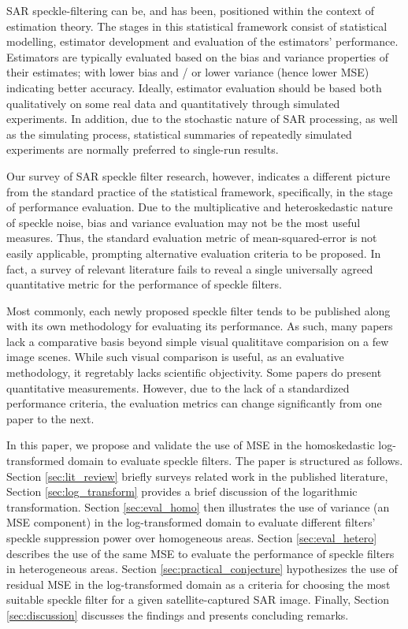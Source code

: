 \documentclass[journal]{IEEEtran}
\begin{document}
SAR speckle-filtering can be, and has been, positioned within the context of estimation theory\cite{Touzi_2002_TGRS}. 
The stages in this statistical framework consist of statistical modelling, estimator development and evaluation of the estimators' performance. 
Estimators are typically evaluated based on the bias and variance properties of their estimates; 
	with lower bias and / or lower variance (hence lower MSE) indicating better accuracy.
Ideally, estimator evaluation should be based both qualitatively on some real data and quantitatively through simulated experiments. 
In addition, due to the stochastic nature of SAR processing, as well as the simulating process, 
	statistical summaries of repeatedly simulated experiments are normally preferred to single-run results.

Our survey of SAR speckle filter research, however, indicates 
	a different picture from the standard practice of the statistical framework, 
	specifically, in the stage of performance evaluation. 
Due to the multiplicative and heteroskedastic nature of speckle noise, 
	bias and variance evaluation may not be the most useful measures. 
Thus, the standard evaluation metric of mean-squared-error is not easily applicable,
	prompting alternative evaluation criteria to be proposed.
In fact, a survey of relevant literature fails to reveal 
	a single universally agreed quantitative metric for the performance of speckle filters.

Most commonly, each newly proposed speckle filter tends to be published along with its own methodology for evaluating its 
	performance. 
As such, many papers lack a comparative basis beyond simple visual qualititave comparision on a few image scenes. 
While such visual comparison is useful, as an evaluative methodology, it regretably lacks scientific objectivity. 
Some papers do present quantitative measurements. 
However, due to the lack of a standardized performance criteria, 
	the evaluation metrics can change significantly from one paper to the next.

In this paper, we propose and validate the use of MSE in the homoskedastic log-transformed domain to evaluate speckle filters. 
The paper is structured as follows.
Section \ref{sec:lit_review} briefly surveys related work in the published literature, 
Section \ref{sec:log_transform} provides a brief discussion of the logarithmic transformation.
Section \ref{sec:eval_homo} then illustrates the use of variance (an MSE component) in the log-transformed domain to 
	evaluate different filters' speckle suppression power over homogeneous areas.
Section \ref{sec:eval_hetero} describes the use of the same MSE to evaluate the performance of speckle filters in heterogeneous areas.
Section \ref{sec:practical_conjecture} hypothesizes the use of residual MSE in the log-transformed domain 
	as a criteria for choosing the most suitable speckle filter for a given satellite-captured SAR image.
Finally, Section \ref{sec:discussion} discusses the findings and presents concluding remarks.
\end{document}
